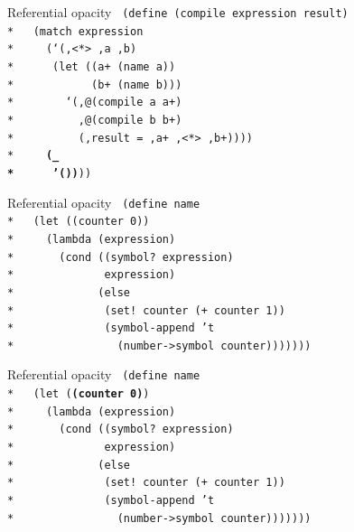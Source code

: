 \documentclass{beamer}
\begin{document}
\begin{frame}{Referential opacity}
  \texttt{
    (define (compile expression result) \\*
    \ \ (match expression \\*
    \ \ \ \ (`(,<*> ,a ,b) \\*
    \ \ \ \ \ (let ((a+ (name a)) \\*
    \ \ \ \ \ \ \ \ \ \ \ (b+ (name b))) \\*
    \ \ \ \ \ \ \ `(,@(compile a a+)\\*
    \ \ \ \ \ \ \ \ \ ,@(compile b b+)\\*
    \ \ \ \ \ \ \ \ \ (,result = ,a+ ,<*> ,b+))))\\*
    \ \ \ \ \textbf{(\_\\*
    \ \ \ \ \ '())}))
  }
\end{frame}

\begin{frame}{Referential opacity}
  \texttt{
    (define name \\*
    \ \ (let ((counter 0)) \\*
    \ \ \ \ (lambda (expression)\\*
    \ \ \ \ \ \ (cond ((symbol? expression)\\*
    \ \ \ \ \ \ \ \ \ \ \ \ \ expression)\\*
    \ \ \ \ \ \ \ \ \ \ \ \ (else\\*
    \ \ \ \ \ \ \ \ \ \ \ \ \ (set! counter (+ counter 1))\\*
    \ \ \ \ \ \ \ \ \ \ \ \ \ (symbol-append 't\\*
    \ \ \ \ \ \ \ \ \ \ \ \ \ \ \ (number->symbol counter)))))))
  }
\end{frame}

\begin{frame}{Referential opacity}
  \texttt{
    (define name \\*
    \ \ (let (\textbf{(counter 0)}) \\*
    \ \ \ \ (lambda (expression)\\*
    \ \ \ \ \ \ (cond ((symbol? expression)\\*
    \ \ \ \ \ \ \ \ \ \ \ \ \ expression)\\*
    \ \ \ \ \ \ \ \ \ \ \ \ (else\\*
    \ \ \ \ \ \ \ \ \ \ \ \ \ (set! counter (+ counter 1))\\*
    \ \ \ \ \ \ \ \ \ \ \ \ \ (symbol-append 't\\*
    \ \ \ \ \ \ \ \ \ \ \ \ \ \ \ (number->symbol counter)))))))
  }
\end{frame}
\end{document}

